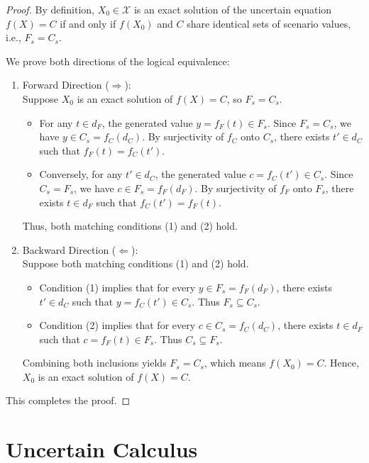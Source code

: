 \documentclass[a4paper,12pt,twoside]{memoir}
\begin{document}
	\begin{proof}
		By definition, $X_0 \in \mathcal{X}$ is an exact solution of the uncertain equation $f(X) = C$ if and only if $f(X_0)$ and $C$ share identical sets of scenario values, i.e., $F_s = C_s$.
		
		We prove both directions of the logical equivalence:
		
		\begin{enumerate}[leftmargin=*]
			\item Forward Direction ($\Rightarrow$): \\
			Suppose $X_0$ is an exact solution of $f(X) = C$, so $F_s = C_s$.
			\begin{itemize}[leftmargin=*]
				\item For any $t \in d_F$, the generated value $y = f_F(t) \in F_s$. Since $F_s = C_s$, we have $y \in C_s = f_C(d_C)$. By surjectivity of $f_C$ onto $C_s$, there exists $t' \in d_C$ such that $f_F(t) = f_C(t')$.
				\item Conversely, for any $t' \in d_C$, the generated value $c = f_C(t') \in C_s$. Since $C_s = F_s$, we have $c \in F_s = f_F(d_F)$. By surjectivity of $f_F$ onto $F_s$, there exists $t \in d_F$ such that $f_C(t') = f_F(t)$.
			\end{itemize}
			Thus, both matching conditions (1) and (2) hold.
			
			\item Backward Direction ($\Leftarrow$): \\
			Suppose both matching conditions (1) and (2) hold.
			\begin{itemize}[leftmargin=*]
				\item Condition (1) implies that for every $y \in F_s = f_F(d_F)$, there exists $t' \in d_C$ such that $y = f_C(t') \in C_s$. Thus $F_s \subseteq C_s$.
				\item Condition (2) implies that for every $c \in C_s = f_C(d_C)$, there exists $t \in d_F$ such that $c = f_F(t) \in F_s$. Thus $C_s \subseteq F_s$.
			\end{itemize}
			Combining both inclusions yields $F_s = C_s$, which means $f(X_0) = C$. Hence, $X_0$ is an exact solution of $f(X) = C$.
		\end{enumerate}
		
		This completes the proof.
	\end{proof}
	
	\chapter{Uncertain Calculus}
	
\end{document}
